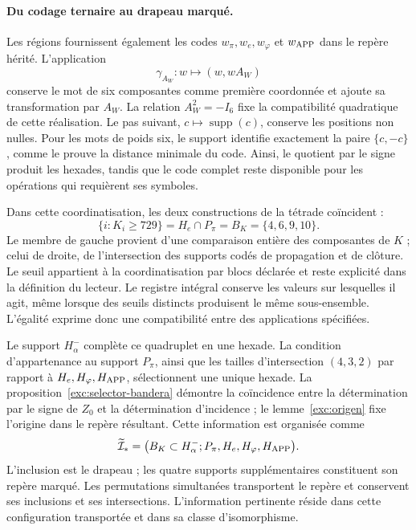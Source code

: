 \paragraph{Du codage ternaire au drapeau marqué.}
\label{inc-ampl-bandera}
Les régions fournissent également les codes $w_\pi,w_e,w_\varphi$ et
$w_{\rm APP}$ dans le repère hérité. L'application
\[
 \gamma_{A_W}:w\longmapsto(w,wA_W)
\]
conserve le mot de six composantes comme première coordonnée et ajoute
sa transformation par $A_W$. La relation $A_W^2=-I_6$ fixe la
compatibilité quadratique de cette réalisation. Le pas suivant,
$c\mapsto\operatorname{supp}(c)$, conserve les positions non nulles.
Pour les mots de poids six, le support identifie exactement la paire
$\{c,-c\}$, comme le prouve la distance minimale du code. Ainsi,
le quotient par le signe produit les hexades, tandis que le code complet
reste disponible pour les opérations qui requièrent ses symboles.

Dans cette coordinatisation, les deux constructions de la tétrade coïncident :
\begin{equation}
 \{i:K_i\geq729\}
 =H_e\cap P_\pi=B_K=\{4,6,9,10\}.
 \label{inc-ampl-cuaterna}
\end{equation}
Le membre de gauche provient d'une comparaison entière des composantes
de $K$ ; celui de droite, de l'intersection des supports codés de
propagation et de clôture. Le seuil appartient à la coordinatisation par blocs
déclarée et reste explicité dans la définition du lecteur. Le
registre intégral conserve les valeurs sur lesquelles il agit, même lorsque
des seuils distincts produisent le même sous-ensemble. L'égalité exprime
donc une compatibilité entre des applications spécifiées.

Le support $H^-_\alpha$ complète ce quadruplet en une hexade. La
condition d’appartenance au support $P_\pi$, ainsi que les tailles
d’intersection $(4,3,2)$ par rapport à $H_e,H_\varphi,H_{\rm APP}$,
sélectionnent une unique hexade. La proposition~\ref{exc:selector-bandera}
démontre la coïncidence entre la détermination par le signe de $Z_0$
et la détermination d’incidence ; le lemme~\ref{exc:origen} fixe l’origine
dans le repère résultant. Cette information est organisée comme
\begin{equation}
 \widetilde{\mathcal I}_*
 =\bigl(B_K\subset H^-_\alpha;
         P_\pi,H_e,H_\varphi,H_{\rm APP}\bigr).
 \label{inc-ampl-marco}
\end{equation}
L'inclusion est le drapeau ; les quatre supports supplémentaires constituent
son repère marqué. Les permutations simultanées transportent le repère et
conservent ses inclusions et ses intersections. L'information pertinente réside
dans cette configuration transportée et dans sa classe d'isomorphisme.

